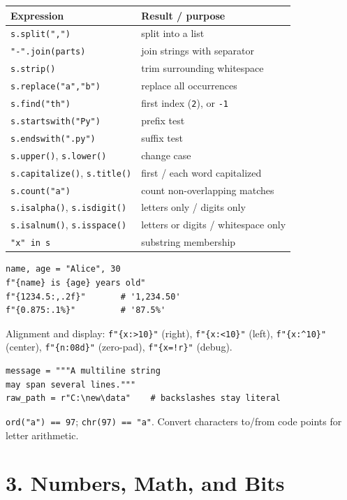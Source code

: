 \documentclass[10pt,a4paper]{article}
\newcommand{\py}[1]{\texttt{#1}}
\newenvironment{tbl}{\par\begin{lrbox}{\tblbox}\begin{minipage}{\linewidth}\compacttable}%
  {\end{minipage}\end{lrbox}\noindent\raisebox{\dp\tblbox}{\usebox{\tblbox}}\par}
\newcommand{\compacttable}{\fontsize{10}{11.2}\selectfont\setlength{\tabcolsep}{2.5pt}\renewcommand{\arraystretch}{1.08}}
\begin{document}
\begin{multicols}{2}
\begin{tbl}
\begin{tabularx}{\linewidth}{@{}R{.46\linewidth}L@{}}
\toprule
\textbf{Expression} & \textbf{Result / purpose} \\
\midrule
\py{s.split(",")} & split into a list \\
\py{"-".join(parts)} & join strings with separator \\
\py{s.strip()} & trim surrounding whitespace \\
\py{s.replace("a","b")} & replace all occurrences \\
\py{s.find("th")} & first index (\py{2}), or \py{-1} \\
\py{s.startswith("Py")} & prefix test \\
\py{s.endswith(".py")} & suffix test \\
\py{s.upper()}, \py{s.lower()} & change case \\
\py{s.capitalize()}, \py{s.title()} & first / each word capitalized \\
\py{s.count("a")} & count non-overlapping matches \\
\py{s.isalpha()}, \py{s.isdigit()} & letters only / digits only \\
\py{s.isalnum()}, \py{s.isspace()} & letters or digits / whitespace only \\
\py{"x" in s} & substring membership \\
\bottomrule
\end{tabularx}
\end{tbl}

\begin{lstlisting}
name, age = "Alice", 30
f"{name} is {age} years old"
f"{1234.5:,.2f}"       # '1,234.50'
f"{0.875:.1%}"         # '87.5%'
\end{lstlisting}

Alignment and display: \py{f"\{x:>10\}"} (right), \py{f"\{x:<10\}"} (left), \py{f"\{x:\textasciicircum{}10\}"} (center), \py{f"\{n:08d\}"} (zero-pad), \py{f"\{x=!r\}"} (debug).

\begin{lstlisting}
message = """A multiline string
may span several lines."""
raw_path = r"C:\new\data"    # backslashes stay literal
\end{lstlisting}

\py{ord("a") == 97}; \py{chr(97) == "a"}. Convert characters to/from code points for letter arithmetic.

\section{3. Numbers, Math, and Bits}


\end{multicols}
\end{document}
